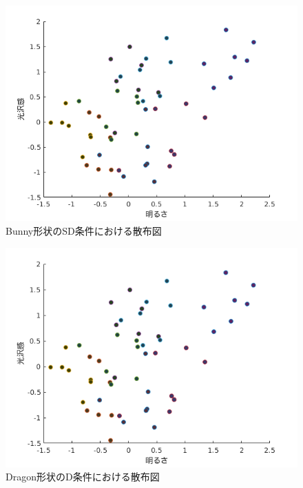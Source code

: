             \begin{figure}[h]
                \centering
                \includegraphics[width=12.0cm]{./img/ex3_BSD.png}
                \caption{Bunny形状のSD条件における散布図}
                \label{ex3_DSD}
            \end{figure}

            \begin{figure}[h]
                \centering
                \includegraphics[width=12.0cm]{./img/ex3_DD.png}
                \caption{Dragon形状のD条件における散布図}
                \label{ex3_DD}
            \end{figure}

